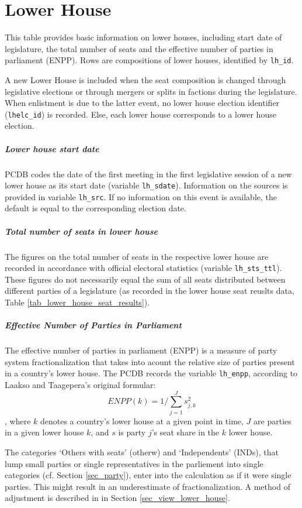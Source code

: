 \section{Lower House}\label{sec_lower_house}
This table provides basic information on lower houses, including start date of legislature, the total number of seats and the effective number of parties in parliament (ENPP).
Rows are compositions of lower houses, identified by \texttt{\footnotesize lh\_id}. 

A new Lower House is included when the seat composition is changed through legislative elections or through mergers or splits in factions during the legislature. When enlistment is due to the latter event, no lower house 
election identifier (\texttt{\footnotesize lhelc\_id}) is recorded. Else, each lower house corresponds to a lower house election.

\subparagraph{Lower house start date}
PCDB codes the date of the first meeting in the first legislative session of a new lower house as its start date (variable \texttt{\footnotesize lh\_sdate}). Information on the sources is provided in variable \texttt{\footnotesize lh\_src}. If no information on this event is available, the default is equal to the corresponding election date. 

\subparagraph{Total number of seats in lower house} 
The figures on the total number of seats in the respective lower house are recorded in accordance with official electoral statistics (variable \texttt{\footnotesize lh\_sts\_ttl}). These figures do not necessarily equal the sum of all seats distributed between different parties of a legislature (as recorded in the lower house seat reuslts data,  Table \ref{tab_lower_house_seat_results}).

\subparagraph{Effective Number of Parties in Parliament}
The effective number of parties in parliament (ENPP) is a measure of party system fractionalization that takes into acount the relative size of parties present in a country's lower house. 
The PCDB records the variable \texttt{\footnotesize lh\_enpp}, according to Laakso and Taagepera's 
original formular:
\begin{equation}\label{ENPP_equ}
ENPP(k) = 1/\sum\limits_{j=1}^{J}s_{j,k}^{2}
\end{equation}
, where $k$ denotes a country's lower house at a given point in time, $J$ are parties in a given lower house $k$, and $s$ is party $j$'s seat share in the $k$ lower house. 

The categories `Others with seats' (otherw) and `Independents' (INDs), that lump small parties or single representatives in the parliement into single categories (cf. Section \ref{sec_party}), enter into the calculation as if it were single parties. 
This might result in an underestimate of fractionalization. A method of adjustment is described in in Section \ref{sec_view_lower_house}.

